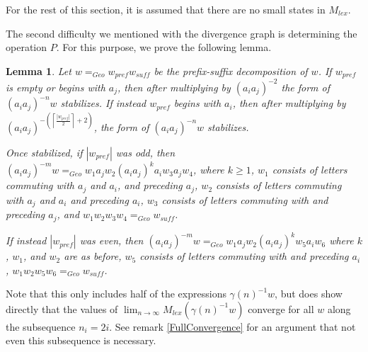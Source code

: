 \documentclass{amsart}
\newtheorem{lemma}[theorem]{Lemma}
\theoremstyle{definition}
\theoremstyle{remark}
\begin{document}
	For the rest of this section, it is assumed that there are no small states in $M_{lex}$.
	
	The second difficulty we mentioned with the divergence graph is determining the operation $P$. For this purpose, we prove the following lemma.
	
	\begin{lemma}
		
		Let $w=_{Geo}w_{pref}w_{suff}$ be the prefix-suffix decomposition of $w$. If $w_{pref}$ is empty or begins with $a_j$, then after multiplying by $(a_ia_j)^{-2}$ the form of $(a_ia_j)^{-n}w$ stabilizes. If instead $w_{pref}$ begins with $a_i$, then after multiplying by $(a_ia_j)^{-\left(\left\lceil\frac{|w_{pref}|}{2}\right\rceil+2\right)}$, the form of $(a_ia_j)^{-n}w$ stabilizes.
		
		Once stabilized, if $|w_{pref}|$ was odd, then $(a_ia_j)^{-m}w=_{Geo} w_1a_jw_2(a_ia_j)^ka_iw_3a_jw_4$, where $k\ge 1$, $w_1$ consists of letters commuting with $a_j$ and $a_i$, and preceding $a_j$, $w_2$ consists of letters commuting with $a_j$ and $a_i$ and preceding $a_i$, $w_3$ consists of letters commuting with and preceding $a_j$, and $w_1w_2w_3w_4=_{Geo}w_{suff}$.
		
		If instead $|w_{pref}|$ was even, then $(a_ia_j)^{-m}w=_{Geo} w_1a_jw_2(a_ia_j)^kw_5a_iw_6$ where $k$, $w_1$, and $w_2$ are as before, $w_5$ consists of letters commuting with and preceding $a_i$, \newline $w_1w_2w_5w_6=_{Geo}w_{suff}$.
		
	\end{lemma}
	
	Note that this only includes half of the expressions $\gamma(n)^{-1}w$, but does show directly that the values of $\lim_{n\to \infty} M_{lex}(\gamma(n)^{-1}w)$ converge for all $w$ along the subsequence $n_i=2i$. See remark \ref{FullConvergence} for an argument that not even this subsequence is necessary.
	
\end{document}
